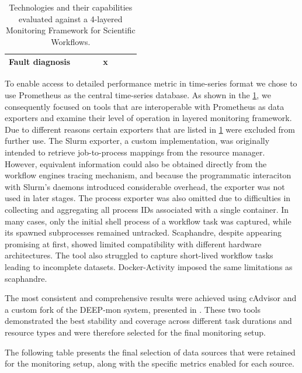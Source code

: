 \begin{table}[htbp]
{\begin{tabular}{lccccccc}
            Fault diagnosis                     &                   &                               &                          & x                   &                         &                           &                           \\
            \bottomrule
        \end{tabular}
    }
    \caption{Technologies and their capabilities evaluated against a 4-layered Monitoring Framework for Scientific Workflows.}
    \label{tab:monitoring-features}
\end{table}

To enable access to detailed performance metric in time-series format we chose to use Prometheus as the central time-series database. As shown in the \ref{tab:monitoring-features}, we consequently focused on tools that are interoperable with Prometheus as data exporters and examine their level of operation in layered monitoring framework.
Due to different reasons certain exporters that are listed in \ref{tab:monitoring-features} were excluded from further use. The Slurm exporter, a custom implementation, was originally intended to retrieve job-to-process mappings from the resource manager. However, equivalent information could also be obtained directly from the workflow engines tracing mechanism, and because the programmatic interaciton with Slurm's daemons introduced considerable overhead, the exporter was not used in later stages. The process exporter was also omitted due to difficulties in collecting and aggregating all process IDs associated with a single container. In many cases, only the initial shell process of a workflow task was captured, while its spawned subprocesses remained untracked.
Scaphandre, despite appearing promising at first, showed limited compatibility with different hardware architectures. The tool also struggled to capture short-lived workflow tasks leading to incomplete datasets. Docker-Activity imposed the same limitations as scaphandre.

The most consistent and comprehensive results were achieved using cAdvisor and a custom fork of the DEEP-mon system, presented in \cite{8425477}. These two tools demonstrated the best stability and coverage across different task durations and resource types and were therefore selected for the final monitoring setup.

The following table presents the final selection of data sources that were retained for the monitoring setup, along with the specific metrics enabled for each source.

